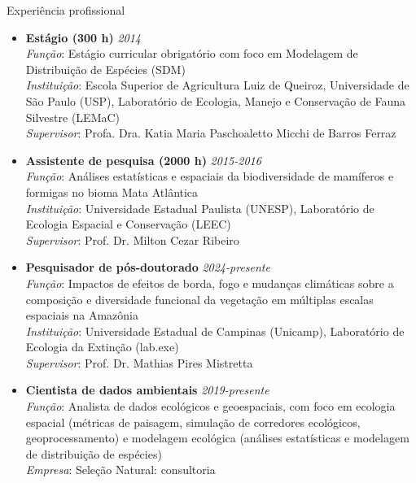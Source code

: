 \documentclass{resume}
\begin{document}
\begin{rSection}{Experiência profissional}
\begin{itemize}
\item {\bf Estágio (300 h)} \hfill{\em 2014}\\
{\it Função}: Estágio curricular obrigatório com foco em Modelagem de Distribuição de Espécies (SDM)\\
{\it Instituição}: Escola Superior de Agricultura Luiz de Queiroz, Universidade de São Paulo (USP), Laboratório de Ecologia, Manejo e Conservação de Fauna Silvestre (LEMaC)\\
{\it Supervisor}: Profa. Dra. Katia Maria Paschoaletto Micchi de Barros Ferraz

\item {\bf Assistente de pesquisa (2000 h)} \hfill{\em 2015-2016}\\
{\it Função}: Análises estatísticas e espaciais da biodiversidade de mamíferos e formigas no bioma Mata Atlântica\\
{\it Instituição}: Universidade Estadual Paulista (UNESP), Laboratório de Ecologia Espacial e Conservação (LEEC)\\
{\it Supervisor}: Prof. Dr. Milton Cezar Ribeiro

\item {\bf Pesquisador de pós-doutorado} \hfill{\em 2024-presente}\\
{\it Função}: Impactos de efeitos de borda, fogo e mudanças climáticas sobre a composição e diversidade funcional da vegetação em múltiplas escalas espaciais na Amazônia\\
{\it Instituição}: Universidade Estadual de Campinas (Unicamp), Laboratório de Ecologia da Extinção (lab.exe)\\
{\it Supervisor}: Prof. Dr. Mathias Pires Mistretta

\item {\bf Cientista de dados ambientais} \hfill{\em 2019-presente}\\
{\it Função}: Analista de dados ecológicos e geoespaciais, com foco em ecologia espacial (métricas de paisagem, simulação de corredores ecológicos, geoprocessamento) e modelagem ecológica (análises estatísticas e modelagem de distribuição de espécies)\\
{\it Empresa}: Seleção Natural: consultoria\\
\end{itemize}
\end{rSection}

\end{document}

